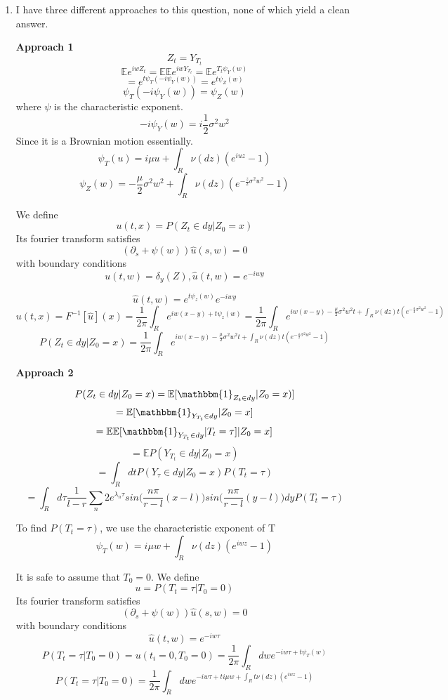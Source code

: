 \documentclass[a4paper,11pt]{article}
\begin{document}
\begin{enumerate}
\begin{enumerate}
  \item

I have three different approaches to this question, none of which yield a clean answer.

{\bf Approach 1}
\[Z_t = Y_{T_t}\]
\[\mathbb{E}e^{iwZ_t} = \mathbb{E}\mathbb{E}e^{iwY_{T_t}} 
= 
\mathbb{E}e^{T_t \psi_Y(w)}\]
\[= 
e^{t \psi_T(-i \psi_Y(w)) } = e^{t\psi_Z(w)}\]
\[\psi_T(-i \psi_Y(w))  = \psi_Z(w)\]
where $\psi$ is the characteristic exponent.
\[ -i\psi_Y(w) = i \frac{1}{2} \sigma^2 w^2 \]
Since it is a Brownian motion essentially.
\[\psi_T(u) = i\mu u + \int_R \nu(dz) (e^{iuz}-1)\]
\[\psi_Z(w) = -\frac{\mu}{2} \sigma^2 w^2 + \int_R \nu(dz) (e^{-\frac{z}{2} \sigma^2 w^2 }-1)\]

We define 
\[u(t,x) = P(Z_t \in dy |Z_0 = x) \]
 Its fourier transform satisfies 
 \[(\partial_s + \psi(w))\hat{u}(s,w) = 0 \]
 with boundary conditions
 \[u(t,w) = \delta_y(Z), \hat{u}(t,w) = e^{-iwy} \]
 
 \[\hat{u}(t,w) = e^{t\psi_z(w)}e^{-iwy}\]
 \[ u(t,x) = F^{-1}[\hat{u}](x) = \frac{1}{2\pi} \int_R e^{iw(x-y)+ t \psi_z(w)} =  \frac{1}{2\pi} \int_R e^{iw(x-y)  -\frac{\mu}{2} \sigma^2 w^2t + \int_R \nu(dz)t (e^{-\frac{z}{2} \sigma^2 w^2 }-1)}\]
  \[P(Z_t \in dy |Z_0 = x) =  \frac{1}{2\pi} \int_R e^{iw(x-y)  -\frac{\mu}{2} \sigma^2 w^2t + \int_R \nu(dz)t (e^{-\frac{z}{2} \sigma^2 w^2 }-1)}\]
 

{\bf Approach 2}

 \[P(Z_t \in dy |Z_0 = x) = \mathbb{E}[\mathbbm{1}_{Z_t \in dy} |Z_0 = x)]\]
 \[= \mathbb{E}[\mathbbm{1}_{Y_{T_t} \in dy} |Z_0 = x]\]
  \[= \mathbb{E}\mathbb{E}[\mathbbm{1}_{Y_{T_t} \in dy}|T_t = \tau] |Z_0 = x]\]
    \[= \mathbb{E} P(Y_{T_t} \in dy |Z_0 = x)\]
    \[= \int_R dt P(Y_{\tau} \in dy |Z_0 = x) P(T_t=\tau)\]
      \[= \int_R d\tau \frac{1}{l-r} \sum_n 2 e^{\lambda_n\tau}sin\bigg(\frac{n\pi}{r-l}(x-l)\bigg)sin\bigg(\frac{n\pi}{r-l}(y-l)\bigg) dy P(T_t=\tau)\]
      
 To find $P(T_t=\tau)$, we use the characteristic exponent of T
    \[\psi_T(w) = i\mu w + \int_R \nu(dz) (e^{iwz}-1)\]
    
 It is safe to assume that $T_0 = 0$. 
 We define 
\[u = P(T_t=\tau |T_0 = 0) \]
 Its fourier transform satisfies 
 \[(\partial_s + \psi(w))\hat{u}(s,w) = 0 \]
 with boundary conditions
 \[ \hat{u}(t,w) = e^{-iw\tau} \]
 \[
 P(T_t=\tau |T_0 = 0) = u(t_i = 0,T_0 = 0) = \frac{1}{2\pi} \int_R dw e^{-iw\tau  + t \psi_T(w)}\]
  \[
 P(T_t=\tau |T_0 = 0) = \frac{1}{2\pi} \int_R dw e^{-iw\tau  + t i\mu w + \int_R t \nu(dz) (e^{iwz}-1)}\]
 

\end{enumerate}
\end{enumerate}
\end{document}
